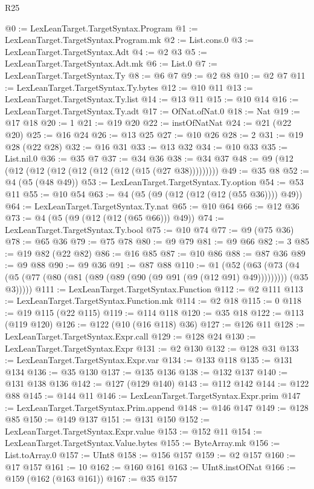 \begin{lexlean}{R25}
\begin{coremodule}
{{{{{{{{{{{{{{{{{{{{{{{{{{{{{{{{{{{{{{{{{{{{{{{{{{{{{{{{{{{{{{{{{{{{{{{{{{{{{{{{{{{{{{{{{{{{{{{{{{{{{{{{{{{{{{{{{{{{{{{{{{{{{{{{{{{{{{{{{{{{{{{{{{{{{{{{{{{{{{{{{{{{{{{{{{{{{{{{{{{{{{{{{{{{{{{{{{{{{{{@0 := LexLeanTarget.TargetSyntax.Program
@1 := LexLeanTarget.TargetSyntax.Program.mk
@2 := List.cons.{0}
@3 := LexLeanTarget.TargetSyntax.Adt
@4 := @2 @3
@5 := LexLeanTarget.TargetSyntax.Adt.mk
@6 := List.{0}
@7 := LexLeanTarget.TargetSyntax.Ty
@8 := @6 @7
@9 := @2 @8
@10 := @2 @7
@11 := LexLeanTarget.TargetSyntax.Ty.bytes
@12 := @10 @11
@13 := LexLeanTarget.TargetSyntax.Ty.list
@14 := @13 @11
@15 := @10 @14
@16 := LexLeanTarget.TargetSyntax.Ty.adt
@17 := OfNat.ofNat.{0}
@18 := Nat
@19 := @17 @18
@20 := 1
@21 := @19 @20
@22 := instOfNatNat
@24 := @21 (@22 @20)
@25 := @16 @24
@26 := @13 @25
@27 := @10 @26
@28 := 2
@31 := @19 @28 (@22 @28)
@32 := @16 @31
@33 := @13 @32
@34 := @10 @33
@35 := List.nil.{0}
@36 := @35 @7
@37 := @34 @36
@38 := @34 @37
@48 := @9 (@12 (@12 (@12 (@12 (@12 (@12 (@12 (@15 (@27 @38)))))))))
@49 := @35 @8
@52 := @4 (@5 (@48 @49))
@53 := LexLeanTarget.TargetSyntax.Ty.option
@54 := @53 @11
@55 := @10 @54
@63 := @4 (@5 (@9 (@12 (@12 (@12 (@55 @36)))) @49))
@64 := LexLeanTarget.TargetSyntax.Ty.nat
@65 := @10 @64
@66 := @12 @36
@73 := @4 (@5 (@9 (@12 (@12 (@65 @66))) @49))
@74 := LexLeanTarget.TargetSyntax.Ty.bool
@75 := @10 @74
@77 := @9 (@75 @36)
@78 := @65 @36
@79 := @75 @78
@80 := @9 @79
@81 := @9 @66
@82 := 3
@85 := @19 @82 (@22 @82)
@86 := @16 @85
@87 := @10 @86
@88 := @87 @36
@89 := @9 @88
@90 := @9 @36
@91 := @87 @88
@110 := @1
    (@52
      (@63
        (@73 (@4 (@5 (@77 (@80 (@81 (@89 (@89 (@90 (@9 @91 (@9 (@12 @91) @49))))))))) (@35 @3)))))
@111 := LexLeanTarget.TargetSyntax.Function
@112 := @2 @111
@113 := LexLeanTarget.TargetSyntax.Function.mk
@114 := @2 @18
@115 := 0
@118 := @19 @115 (@22 @115)
@119 := @114 @118
@120 := @35 @18
@122 := @113 (@119 @120)
@126 := @122 (@10 (@16 @118) @36)
@127 := @126 @11
@128 := LexLeanTarget.TargetSyntax.Expr.call
@129 := @128 @24
@130 := LexLeanTarget.TargetSyntax.Expr
@131 := @2 @130
@132 := @128 @31
@133 := LexLeanTarget.TargetSyntax.Expr.var
@134 := @133 @118
@135 := @131 @134
@136 := @35 @130
@137 := @135 @136
@138 := @132 @137
@140 := @131 @138 @136
@142 := @127 (@129 @140)
@143 := @112 @142
@144 := @122 @88
@145 := @144 @11
@146 := LexLeanTarget.TargetSyntax.Expr.prim
@147 := LexLeanTarget.TargetSyntax.Prim.append
@148 := @146 @147
@149 := @128 @85
@150 := @149 @137
@151 := @131 @150
@152 := LexLeanTarget.TargetSyntax.Expr.value
@153 := @152 @11
@154 := LexLeanTarget.TargetSyntax.Value.bytes
@155 := ByteArray.mk
@156 := List.toArray.{0}
@157 := UInt8
@158 := @156 @157
@159 := @2 @157
@160 := @17 @157
@161 := 10
@162 := @160 @161
@163 := UInt8.instOfNat
@166 := @159 (@162 (@163 @161))
@167 := @35 @157
}}}}}}}}}}}}}}}}}}}}}}}}}}}}}}}}}}}}}}}}}}}}}}}}}}}}}}}}}}}}}}}}}}}}}}}}}}}}}}}}}}}}}}}}}}}}}}}}}}}}}}}}}}}}}}}}}}}}}}}}}}}}}}}}}}}}}}}}}}}}}}}}}}}}}}}}}}}}}}}}}}}}}}}}}}}}}}}}}}}}}}}}}}}}}}}}}}}}}}}
\end{coremodule}
\end{lexlean}
